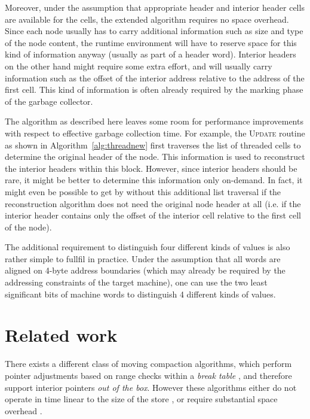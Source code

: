 \documentclass[10pt,a4paper,final,twocolumn]{article}
\begin{document}
Moreover, under the assumption that appropriate header and interior header cells are available
for the cells, the extended algorithm requires no space overhead. Since each node usually has to
carry additional information such as size and type of the node content, the runtime environment will
have to reserve space for this kind of information anyway (usually as part of a header word).
Interior headers on the other hand might require some extra effort, and will usually carry
information such as the offset of the interior address relative to the address of the first
cell. This kind of information is often already required by the marking phase of the garbage
collector.

The algorithm as described here leaves some room for performance improvements with respect to effective
garbage collection time. For example, the \textsc{Update} routine as shown in Algorithm~\ref{alg:threadnew}
first traverses the list of threaded cells to determine the original header of the node. This information is
used to reconstruct the interior headers within this block. However, since interior headers
should be rare, it might be better to determine this information only on-demand. In fact, it
might even be possible to get by without this additional list traversal if the reconstruction
algorithm does not need the original node header at all (i.e. if the interior header contains
only the offset of the interior cell relative to the first cell of the node).

The additional requirement to distinguish four different kinds of values is also rather
simple to fullfil in practice. Under the assumption that all words are aligned on 4-byte
address boundaries (which may already be required by the addressing constraints of the
target machine), one can use the two least significant bits of machine words to distinguish
4 different kinds of values.


\section{Related work}
\label{sec:related}


There exists a different class of moving compaction algorithms, which perform pointer adjustments
based on range checks within a \emph{break table} \cite{FitchNorman78,HaddonWaite67,LangWegbreit72,Wegbreit72},
and therefore support interior pointers \emph{out of the box}. However these algorithms
either do not operate in time linear to the size of the store
\cite{FitchNorman78,HaddonWaite67,Wegbreit72}, or require substantial space
overhead \cite{LangWegbreit72,Wegbreit72}.
\end{document}
